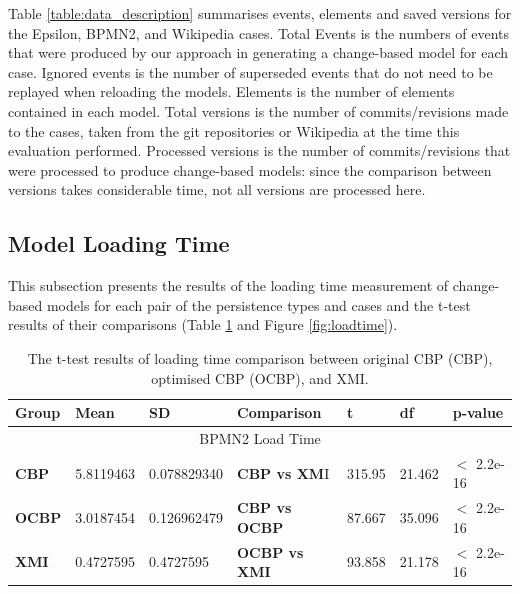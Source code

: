 \documentclass{llncs}
\begin{document}
{Table \ref{table:data_description} summarises events, elements and saved versions for the Epsilon, BPMN2, and Wikipedia cases. Total Events is the numbers of events that were produced by our approach in generating a change-based model for each case.  Ignored events is the number of superseded events that do not need to be replayed when reloading the models. Elements is the number of elements contained in each model. Total versions is the number of commits/revisions made to the cases, taken from the git repositories or Wikipedia at the time this evaluation performed. Processed versions is the number of commits/revisions that were processed to produce change-based models: since the comparison between versions takes considerable time, not all versions are processed here.

\subsection{Model Loading Time}
\label{subsec:loading_time_test}

 This subsection presents the results of the loading time measurement of change-based models for each pair of the persistence types and cases and the t-test results of their comparisons (Table \ref{table:ttest_results_loadtime} and Figure \ref{fig:loadtime}). 
 
 \vspace{-10pt}
 \begin{table}[ht]
     \footnotesize
     \centering
     \caption{The t-test results of loading time comparison between original CBP (CBP), optimised CBP (OCBP), and XMI.}
     \label{table:ttest_results_loadtime}
     \begin{tabular}
         {|p{}|p{}|p{}|p{}|p{}|p{}|p{}|}
         \hline 
         
         \textbf{Group} & \textbf{Mean} & \textbf{SD} & \textbf{Comparison} & \textbf{t}  & \textbf{df} & \textbf{p-value} \\  
         \hline 
         \multicolumn{7}{|c|}{BPMN2 Load Time} \\
         \hline 
         \textbf{CBP} & 5.8119463   & 0.078829340 & \textbf{CBP vs XM}I & 315.95    &21.462 & $<$ 2.2e-16 \\  
         \hline 
         \textbf{OCBP} & 3.0187454   & 0.126962479 & \textbf{CBP vs OCBP} & 87.667 & 35.096  & $<$ 2.2e-16 \\  
         \hline 
         \textbf{XMI} &0.4727595   & 0.4727595 & \textbf{OCBP vs XMI} & 93.858    & 21.178  & $<$ 2.2e-16 \\ 
         \hline 
         

\end{tabular}
\end{table}}
\end{document}
